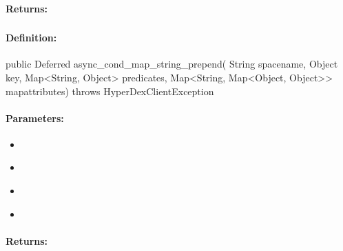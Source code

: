 \paragraph{Returns:}


\pagebreak
\subsubsection{}
\label{api:java:async_cond_map_string_prepend}


\paragraph{Definition:}
\begin{javacode}
public Deferred async_cond_map_string_prepend(
        String spacename,
        Object key,
        Map<String, Object> predicates,
        Map<String, Map<Object, Object>> mapattributes) throws HyperDexClientException
\end{javacode}

\paragraph{Parameters:}
\begin{itemize}[noitemsep]
\item {}\\

\item {}\\

\item {}\\

\item {}\\

\end{itemize}

\paragraph{Returns:}


